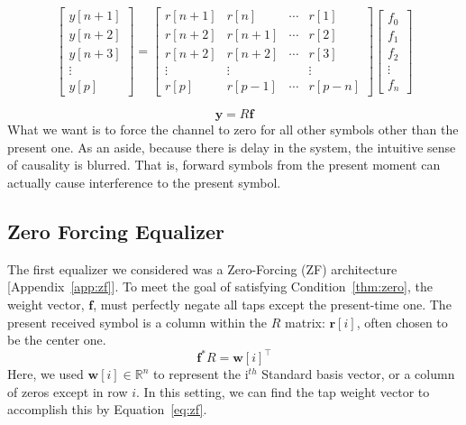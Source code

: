 \documentclass[]{article}
\begin{document}
\begin{equation}
\label{eq:equalizerVector}
\left[ \begin{array}{c}
 y \left[n+1\right] \\
 y \left[n+2\right] \\
 y \left[n+3\right] \\
\vdots  \\
y\left[ p \right] \end{array} \right] = 
\begin{bmatrix} 
r \left[ n+1\right]  & r[n] & \cdots & r\left[ 1 \right] \\ 
r \left[ n+2\right]  & r[n+1] & \cdots & r\left[ 2 \right] \\ 
r \left[ n+2\right]  & r[n+2] & \cdots & r\left[ 3 \right] \\ 
\vdots & \vdots & & \vdots \\
r \left[p \right] & r\left[ p-1 \right] & \cdots & r\left[ p-n \right]
\end{bmatrix}
 \left[ \begin{array}{c} f_0 \\ f_1 \\ f_2 \\ \vdots \\ f_n \end{array} \right]
\end{equation}

\begin{equation}
\label{eq:equalizerMatrix}
\mathbf{y} = R\mathbf{f}
\end{equation}
What we want is to force the channel to zero for all other symbols other than the present one.  As an aside, because there is delay in the system, the intuitive sense of causality is blurred. That is, forward symbols from the present moment can actually cause interference to the present symbol. \\

\subsection{Zero Forcing Equalizer}
\label{sec:zf}
The first equalizer we considered was a Zero-Forcing (ZF) architecture [Appendix~\ref{app:zf}].  To meet the goal of satisfying Condition~\ref{thm:zero}, the weight vector, $\mathbf{f}$, must perfectly negate all taps except the present-time one.  The present received symbol is a column within the $R$ matrix: $\mathbf{r}[i]$, often chosen to be the center one.  
$$ \mathbf{f}^{\ast}R = \mathbf{w}[i]^{\top} $$
Here, we used  $\mathbf{w} [i] \in \mathbb{R}^n$ to represent the i$^{th}$ Standard basis vector, or a column of zeros except in row $i$.  In this setting, we can find the tap weight vector to accomplish this by Equation~\ref{eq:zf}.  \\
\end{document}
